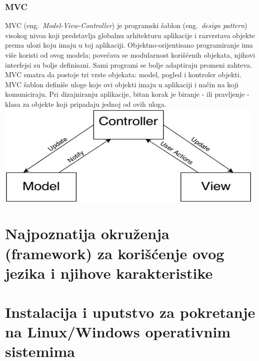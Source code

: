\documentclass[a4paper]{article}
\begin{document}
\subsubsection{MVC}
MVC (eng.~{\em Model-View-Controller}) je programski šablon (eng.~{\em design pattern}) visokog nivoa koji predstavlja globalnu arhitekturu aplikacije i razvrstava objekte prema ulozi koju imaju u toj aplikaciji.
Objektno-orijentisano programiranje ima više koristi od ovog modela; povećava se modularnost korišćenih objekata, njihovi interfejsi su bolje definisani. Sami programi se bolje adaptiraju promeni zahteva.
MVC smatra da postoje tri vrste objekata: model, pogled i kontroler objekti. MVC šablon definiše uloge koje ovi objekti imaju u aplikaciji i način na koji komuniciraju. Pri dizajniranju aplikacije, bitan korak je biranje - ili pravljenje - klasa za objekte koji pripadaju jednoj od ovih uloga. 
\includegraphics{traditional_mvc1}

\section{Najpoznatija okruženja (framework) za korišćenje ovog jezika i njihove karakteristike}
\label{sec:okruzenja}

\section{Instalacija i uputstvo za pokretanje na Linux/Windows operativnim sistemima}
\label{sec:instalacija}
\end{document}
